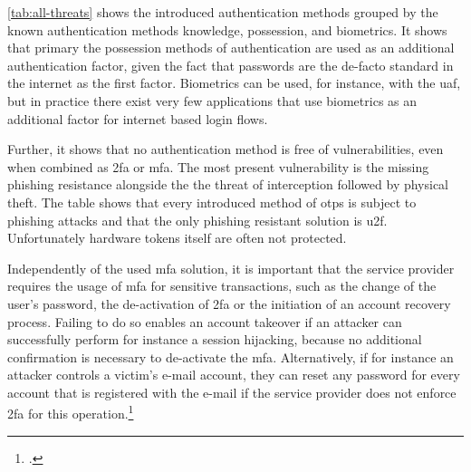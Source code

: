\autoref{tab:all-threats} shows the introduced authentication methods grouped by the known authentication methods knowledge, possession, and biometrics. It shows that primary the possession methods of authentication are used as an additional authentication factor, given the fact that passwords are the de-facto standard in the internet as the first factor. Biometrics can be used, for instance, with the \gls{uaf}, but in practice there exist very few applications that use biometrics as an additional factor for internet based login flows.

Further, it shows that no authentication method is free of vulnerabilities, even when combined as \gls{2fa} or \gls{mfa}. The most present vulnerability is the missing phishing resistance alongside the the threat of interception followed by physical theft. The table shows that every introduced method of \glspl{otp} is subject to phishing attacks and that the only phishing resistant solution is \gls{u2f}. Unfortunately hardware tokens itself are often not protected.

Independently of the used \gls{mfa} solution, it is important that the service provider requires the usage of \gls{mfa} for sensitive transactions, such as the change of the user's password, the de-activation of \gls{2fa} or the initiation of an account recovery process. Failing to do so enables an account takeover if an attacker can successfully perform for instance a session hijacking, because no additional confirmation is necessary to de-activate the \gls{mfa}. Alternatively, if for instance an attacker controls a victim's e-mail account, they can reset any password for every account that is registered with the e-mail if the service provider does not enforce \gls{2fa} for this operation.\footcites[See][370]{10.1007/978-3-662-45472-5_24}